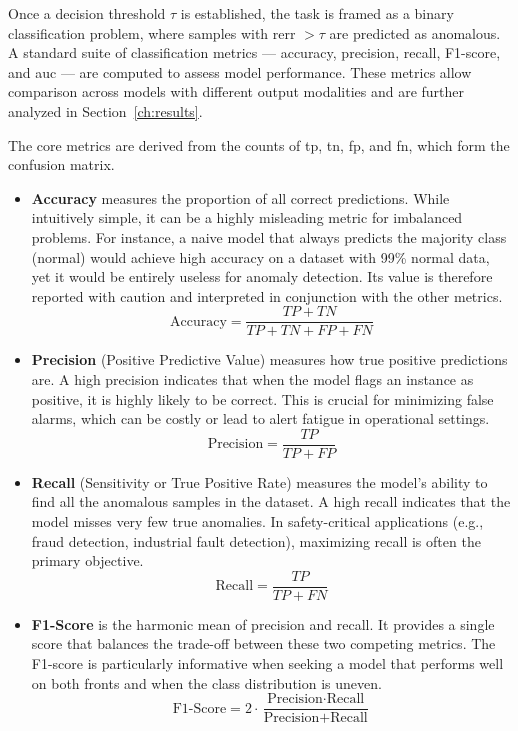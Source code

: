 Once a decision threshold $\tau$ is established, the task is framed as a binary classification problem, where samples with \gls{rerr} $> \tau$ are predicted as anomalous.
A standard suite of classification metrics — accuracy, precision, recall, F1-score, and \gls{auc} — are computed to assess model performance.
These metrics allow comparison across models with different output modalities and are further analyzed in Section~\ref{ch:results}.

The core metrics are derived from the counts of \gls{tp}, \gls{tn}, \gls{fp}, and \gls{fn}, which form the confusion matrix.

\begin{itemize}
    \item \textbf{Accuracy} measures the proportion of all correct predictions. 
    While intuitively simple, it can be a highly misleading metric for imbalanced problems. 
    For instance, a naive model that always predicts the majority class (normal) would achieve high accuracy on a dataset with 99\% normal data, yet it would be entirely useless for anomaly detection. 
    Its value is therefore reported with caution and interpreted in conjunction with the other metrics.
        \begin{equation}
            \text{Accuracy} = \frac{TP + TN}{TP + TN + FP + FN}
        \end{equation}
    
    \item \textbf{Precision} (Positive Predictive Value) measures how true positive predictions are. 
    A high precision indicates that when the model flags an instance as positive, it is highly likely to be correct. 
    This is crucial for minimizing false alarms, which can be costly or lead to alert fatigue in operational settings.
        \begin{equation}
            \text{Precision} = \frac{TP}{TP + FP}
        \end{equation}

    \item \textbf{Recall} (Sensitivity or True Positive Rate) measures the model's ability to find all the anomalous samples in the dataset. 
    A high recall indicates that the model misses very few true anomalies. 
    In safety-critical applications (e.g., fraud detection, industrial fault detection), maximizing recall is often the primary objective.
        \begin{equation}
            \text{Recall} = \frac{TP}{TP + FN}
        \end{equation}

    \item \textbf{F1-Score} is the harmonic mean of precision and recall. 
    It provides a single score that balances the trade-off between these two competing metrics. 
    The F1-score is particularly informative when seeking a model that performs well on both fronts and when the class distribution is uneven.
        \begin{equation}
            \text{F1-Score} = 2 \cdot \frac{\text{Precision} \cdot \text{Recall}}{\text{Precision} + \text{Recall}}
        \end{equation}
\end{itemize}

